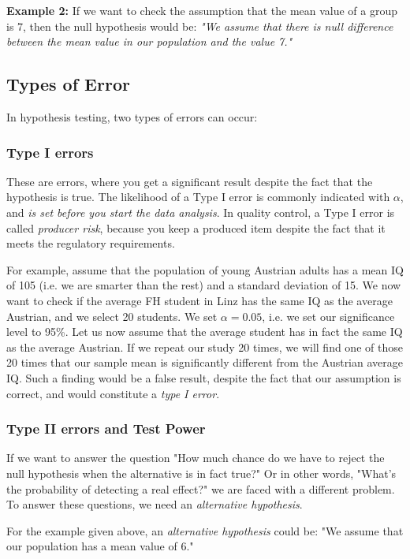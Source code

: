 \textbf{Example 2: } If we want to check the assumption that the mean value of a group is 7, then the null hypothesis would be: \emph{"We assume that there is null difference between the mean value in our population and the value 7."}

\subsection{Types of Error}
In hypothesis testing, two types of errors can occur:

\subsubsection{Type I errors}  
These are errors, where you get a significant result despite the fact that the hypothesis is true. The likelihood of a Type I error is commonly indicated with $\alpha$, and \emph{is set before you start the data analysis}. In quality control, a Type I error is called \emph{producer risk}, because you keep a produced item despite the fact that it meets the regulatory requirements.

For example, assume that the population of young Austrian adults has a mean IQ of 105 (i.e. we are smarter than the rest) and a standard deviation of 15. We now want to check if the average FH student in Linz has the same IQ as the average Austrian, and we select 20 students. We set $\alpha=0.05$, i.e. we set our significance level to 95\%.
Let us now assume that the average student has in fact the same IQ as the average Austrian. If we repeat our study 20 times, we will find one of those 20 times that our sample mean is significantly different from the Austrian average IQ. Such a finding would be a false result, despite the fact that our assumption is correct, and would constitute a \emph{type I error}.

\subsubsection{Type II errors and Test Power}
If we want to answer the question "How much chance do we have to reject the null hypothesis when the alternative is in fact true?" Or in other words, "What’s the probability of detecting a real effect?" we are faced with a different problem. To answer these questions, we need an \emph{alternative hypothesis}.

For the example given above, an \emph{alternative hypothesis} could be: "We assume that our population has a mean value of 6."

